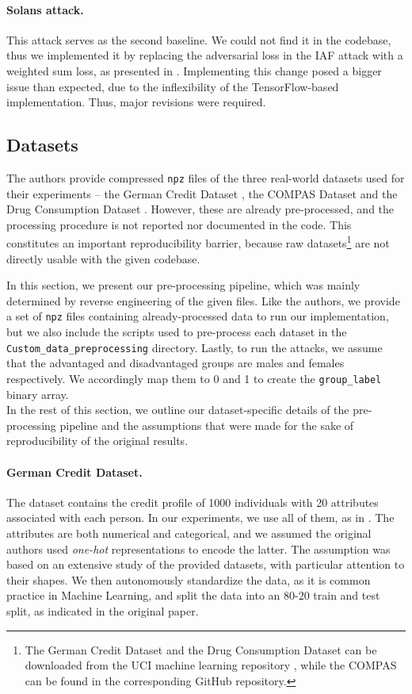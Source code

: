 \paragraph{Solans attack.} This attack serves as the second baseline. We could not find it in the codebase, thus we implemented it by replacing the adversarial loss in the IAF attack with a weighted sum loss, as presented in \citep{solans2020}. Implementing this change posed a bigger issue than expected, due to the inflexibility of the TensorFlow-based implementation. Thus, major revisions were required.  

\subsection{Datasets}
\label{sec:datasets}
The authors provide compressed \texttt{npz} files of the three real-world datasets used for their experiments -- the German Credit Dataset \citep{german_drug_dataset}, the COMPAS Dataset \citep{compas_dataset} and the Drug Consumption Dataset \citep{german_drug_dataset}. However, these are already pre-processed, and the processing procedure is not reported nor documented in the code. This constitutes an important reproducibility barrier, because raw datasets\footnote{The German Credit Dataset and the Drug Consumption Dataset can be downloaded from the UCI machine learning repository \citep{german_drug_dataset}, while the COMPAS can be found in the corresponding GitHub repository\citep{compas_dataset}.} are not directly usable with the given codebase. 

In this section, we present our pre-processing pipeline, which was mainly determined by reverse engineering of the given files. Like the authors, we provide a set of \texttt{npz} files containing already-processed data to run our implementation, but we also include the scripts used to pre-process each dataset in the \texttt{Custom\_data\_preprocessing} directory. Lastly, to run the attacks, we assume that the advantaged and disadvantaged groups are males and females respectively. We accordingly map them to 0 and 1 to create the \texttt{group\_label} binary array.\\
In the rest of this section, we outline our dataset-specific details of the pre-processing pipeline and the assumptions that were made for the sake of reproducibility of the original results.

\paragraph{German Credit Dataset.} The dataset contains the credit profile of 1000 individuals with 20 attributes associated with each person.
In our experiments, we use all of them, as in \citep{originalpaper}. The attributes are both numerical and categorical, and we assumed the original authors used \textit{one-hot} representations to encode the latter. The assumption was based on an extensive study of the provided datasets, with particular attention to their shapes. We then autonomously standardize the data, as it is common practice in Machine Learning, and split the data into an 80-20 train and test split, as indicated in the original paper.

